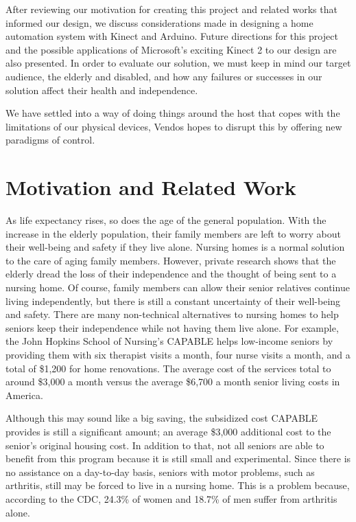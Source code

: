 \documentclass{chi-ext}
\begin{document}
After reviewing our motivation for creating this project and related works that informed our design, we discuss considerations made in designing a home automation system with Kinect and Arduino.
Future directions for this project and the possible applications of Microsoft's exciting Kinect 2 to our design are also presented.
In order to evaluate our solution, we must keep in mind our target audience, the elderly and disabled, and how any failures or successes in our solution affect their health and independence.

We have settled into a way of doing things around the host that copes with the limitations of our physical devices, Vendos hopes to disrupt this by offering new paradigms of control.

\section{Motivation and Related Work}
As life expectancy rises\cite{_life}, so does the age of the general population.
With the increase in the elderly population, their family members are left to worry about their well-being and safety if they live alone.
Nursing homes is a normal solution to the care of aging family members.
However, private research shows that the elderly dread the loss of their independence and the thought of being sent to a nursing home\cite{_seniors, _caregiving}.
Of course, family members can allow their senior relatives continue living independently, but there is still a constant uncertainty of their well-being and safety\cite{_caregiving}.
There are many non-technical alternatives to nursing homes to help seniors keep their independence while not having them live alone.
For example, the John Hopkins School of Nursing's CAPABLE helps low-income seniors by providing them with six therapist visits a month, four nurse visits a month, and a total of \$1,200 for home renovations\cite{_nursing}.
The average cost of the services total to around \$3,000 a month versus the average \$6,700 a month senior living costs in America\cite{_forbes}.

Although this may sound like a big saving, the subsidized cost CAPABLE provides is still a significant amount;
an average \$3,000 additional cost to the senior's original housing cost.
In addition to that, not all seniors are able to benefit from this program because it is still small and experimental.
Since there is no assistance on a day-to-day basis, seniors with motor problems, such as arthritis, still may be forced to live in a nursing home.
This is a problem because, according to the CDC, 24.3\% of women and 18.7\% of men suffer from arthritis\cite{_cdc} alone.
\end{document}
